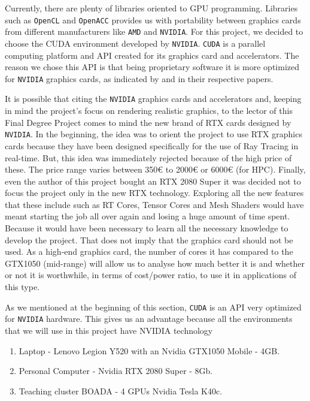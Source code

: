 \documentclass[titlepage,12pt]{report}
\begin{document}
Currently, there are plenty of libraries oriented to GPU programming. Libraries such as \texttt{OpenCL} and \texttt{OpenACC} provides us with portability between graphics cards from different manufacturers like \texttt{AMD} and \texttt{NVIDIA}. For this project, we decided to choose the CUDA environment developed by \texttt{NVIDIA}. \texttt{CUDA} is a parallel computing platform and API created for its graphics card and accelerators. The reason we chose this API is that being proprietary software it is more optimized for \texttt{NVIDIA} graphics cards, as indicated by \citep{Karimi2010} and \citep[pp.~216--215]{Fang2011} in their respective papers.

It is possible that citing the \texttt{NVIDIA} graphics cards and accelerators and, keeping in mind the project's focus on rendering realistic graphics, to the lector of this Final Degree Project comes to mind the new brand of RTX cards designed by \texttt{NVIDIA}. In the beginning, the idea was to orient the project to use RTX graphics cards because they have been designed specifically for the use of Ray Tracing in real-time. But, this idea was immediately rejected because of the high price of these. The price range varies between 350€ to 2000€ or 6000€ (for HPC). Finally, even the author of this project bought an RTX 2080 Super it was decided not to focus the project only in the new RTX technology. Exploring all the new features that these include such as RT Cores, Tensor Cores and Mesh Shaders would have meant starting the job all over again and losing a huge amount of time spent. Because it would have been necessary to learn all the necessary knowledge to develop the project. That does not imply that the graphics card should not be used. As a high-end graphics card, the number of cores it has compared to the GTX1050 (mid-range) will allow us to analyse how much better it is and whether or not it is worthwhile, in terms of cost/power ratio, to use it in applications of this type.

As we mentioned at the beginning of this section,  \texttt{CUDA} is an API very optimized for \texttt{NVIDIA} hardware. This gives us an advantage because all the environments that we will use in this project have NVIDIA technology

\begin{enumerate}
	\item Laptop - Lenovo Legion Y520 with an Nvidia GTX1050 Mobile - 4GB.
	\item Personal Computer - Nvidia RTX 2080 Super - 8Gb.
	\item Teaching cluster BOADA - 4 GPUs Nvidia Tesla K40c.
\end{enumerate}
\end{document}
